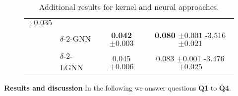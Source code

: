 \documentclass{article}
\newcommand{\xhdr}[1]{{\noindent\bfseries #1}}
\theoremstyle{definition}
\begin{document}
\begin{table}
\begin{center}
\begin{subfigure}[c,top]{0.48\textwidth}
{\begin{tabular}{@{}c <{\enspace}@{}lcc@{}}
{						\scriptsize $\pm 0.035$}                                                                                                                                \\
					&  $\delta$-$2$-\textsf{GNN}      &\textbf{0.042} {\scriptsize $\pm 0.003$}   & \textbf{0.080}                                                                           {\scriptsize $\pm 0.001$} -3.516 {\scriptsize $\pm 0.021$} \\			
					\cmidrule{2-4}	
					\multirow{2}{*}{\rotatebox{90}{}}   & $\delta$-$2$-\textsf{LGNN} &  0.045  \scriptsize $\pm 0.006$ & 0.083 {\scriptsize $\pm 0.001$} -3.476  {\scriptsize $\pm 0.025$} \\
					\bottomrule
			\end{tabular}}\vspace{14pt}
		\end{subfigure}
	\end{center}
		\caption{Additional results for kernel and neural approaches.}\label{add_tt}
\end{table}

\xhdr{Results and discussion} In the following we answer questions \textbf {Q1} to \textbf{Q4}.
\end{document}
